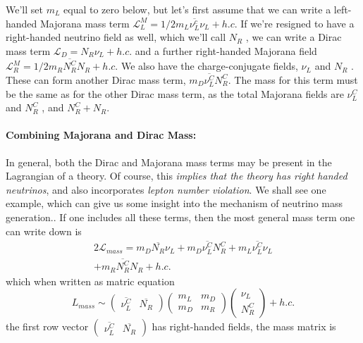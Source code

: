 We’ll set $m_L$ equal to zero below, but let’s first assume that we can write a left-handed Majorana mass term \(\mathcal{L}^M _L = 1/2 m_L \overline{\nu_L^c}\nu_L + h.c\). If we’re resigned to have a right-handed neutrino field as well, which we’ll call $N_R$ , we can write a Dirac mass term $\mathcal{L}_D = N_R \nu _L + h.c$. and a further right-handed Majorana field \(\mathcal{L}_R ^M = 1/2 m_R \overline{N_R ^C}N_R +h.c\). We also have the charge-conjugate fields, $\nu_L$ and $N_R$ . These can form another Dirac mass term, $m_D \overline{\nu _L ^C} N_R^C$. The mass for this term must be the same as for the other Dirac mass term, as the total Majorana fields are \(\nu _L ^C\) and \(N_R^C\) , and \(N_R^C +N_R\).

\paragraph*{Combining Majorana and Dirac Mass:} In general, both the Dirac and Majorana mass terms may be present in the Lagrangian of a theory. Of course, this \textit{implies that the theory has right handed neutrinos}, and also incorporates \textit{lepton number violation}. We shall see one example, which can give us some insight into the mechanism of neutrino mass generation.. If one includes all these terms, then the most general mass term one can write down is
\begin{equation}
    \begin{aligned}
        2 \mathcal{L}_{mass} = m_D \overline{N_R}\nu _L + m_D \overline{\nu _L ^C} N_R^C + m_L \overline{\nu_L^C}\nu_L \\
        + m_R \overline{N_R ^C}N_R + h.c.
    \end{aligned}
\end{equation}
which when written as matric equation 
\begin{equation}
    L_{mass} \sim \begin{pmatrix}\overline{\nu_L^C} & \overline{N_R}\end{pmatrix} \begin{pmatrix}
        m_L & m_D\\
        m_D & m_R
    \end{pmatrix}\begin{pmatrix}
        \nu_L\\N_R ^C
    \end{pmatrix} + h.c.
\end{equation}
the first row vector \(\begin{pmatrix}\overline{\nu_L^C} & \overline{N_R}\end{pmatrix}\) has right-handed fields, the mass matrix is 
